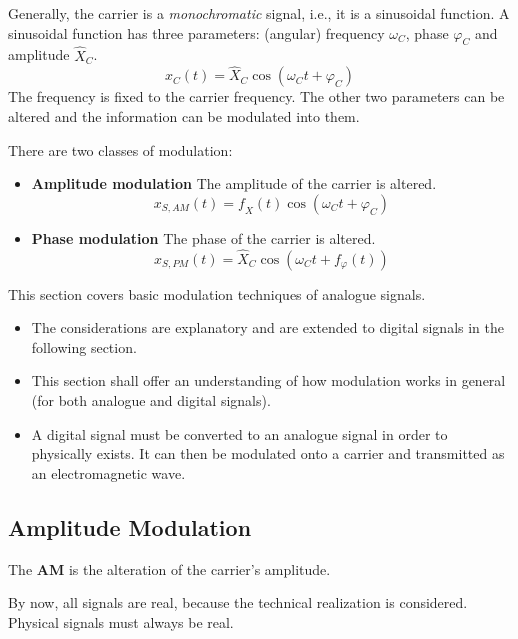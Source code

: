\begin{refsection}
Generally, the carrier is a \emph{monochromatic} signal, i.e., it is a sinusoidal function. A sinusoidal function has three parameters: (angular) frequency $\omega_C$, phase $\varphi_C$ and amplitude $\hat{X}_C$.
\begin{equation}
	x_C(t) = \hat{X}_C \cos\left(\omega_C t + \varphi_C\right)
	\label{eq:ch05:carrier_timedomain}
\end{equation}
The frequency is fixed to the carrier frequency. The other two parameters can be altered and the information can be modulated into them.

There are two classes of modulation:
\begin{itemize}
	\item \textbf{Amplitude modulation} The amplitude of the carrier is altered.
	\begin{equation}
		x_{S,AM}(t) = f_{\hat{X}}(t) \cos\left(\omega_C t + \varphi_C\right)
	\end{equation}
	\item \textbf{Phase modulation} The phase of the carrier is altered.
	\begin{equation}
		x_{S,PM}(t) = \hat{X}_C \cos\left(\omega_C t + f_{\varphi}(t)\right)
	\end{equation}
\end{itemize}

This section covers basic modulation techniques of analogue signals.
\begin{itemize}
	\item The considerations are explanatory and are extended to digital signals in the following section.
	\item This section shall offer an understanding of how modulation works in general (for both analogue and digital signals).
	\item A digital signal must be converted to an analogue signal in order to physically exists. It can then be modulated onto a carrier and transmitted as an electromagnetic wave.
\end{itemize}

\subsection{Amplitude Modulation}

The  \textbf{\ac{AM}} is the alteration of the carrier's amplitude.

\begin{attention}
	By now, all signals are real, because the technical realization is considered. Physical signals must always be real.
\end{attention}


\end{refsection}
